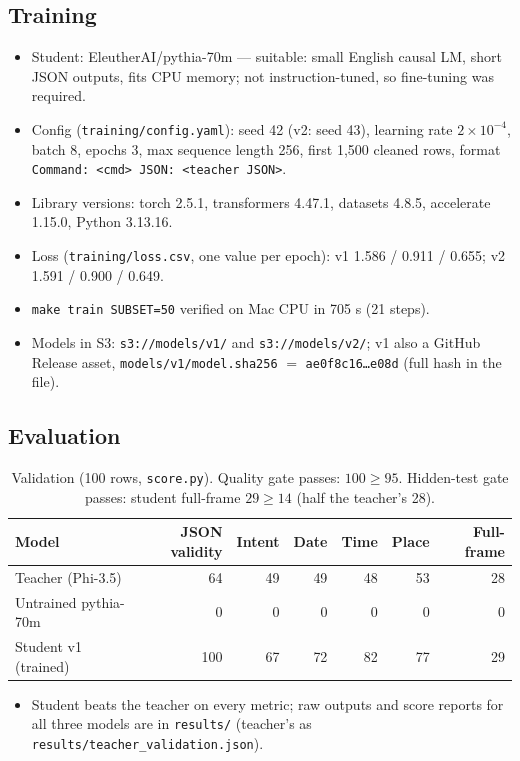 \documentclass[11pt,a4paper]{article}
\begin{document}
\subsection*{Training}
\begin{itemize}
\item Student: EleutherAI/pythia-70m --- suitable: small English causal LM, short JSON outputs, fits CPU memory; not instruction-tuned, so fine-tuning was required.
\item Config (\texttt{training/config.yaml}): seed 42 (v2: seed 43), learning rate $2\times10^{-4}$, batch 8, epochs 3, max sequence length 256, first 1,500 cleaned rows, format \texttt{Command: <cmd> JSON: <teacher JSON>}.
\item Library versions: torch 2.5.1, transformers 4.47.1, datasets 4.8.5, accelerate 1.15.0, Python 3.13.16.
\item Loss (\texttt{training/loss.csv}, one value per epoch): v1 1.586 / 0.911 / 0.655; v2 1.591 / 0.900 / 0.649.
\item \texttt{make train SUBSET=50} verified on Mac CPU in 705 s (21 steps).
\item Models in S3: \texttt{s3://models/v1/} and \texttt{s3://models/v2/}; v1 also a GitHub Release asset, \texttt{models/v1/model.sha256} $=$ \texttt{ae0f8c16\ldots e08d} (full hash in the file).
\end{itemize}
\subsection*{Evaluation}
\begin{table}[h]\centering\small
\begin{tabular}{lrrrrrr}
\toprule
Model & JSON validity & Intent & Date & Time & Place & Full-frame \\
\midrule
Teacher (Phi-3.5) & 64 & 49 & 49 & 48 & 53 & 28 \\
Untrained pythia-70m & 0 & 0 & 0 & 0 & 0 & 0 \\
Student v1 (trained) & 100 & 67 & 72 & 82 & 77 & 29 \\
\bottomrule
\end{tabular}
\caption{Validation (100 rows, \texttt{score.py}). Quality gate passes: $100 \ge 95$. Hidden-test gate passes: student full-frame $29 \ge 14$ (half the teacher's 28).}
\end{table}
\begin{itemize}
\item Student beats the teacher on every metric; raw outputs and score reports for all three models are in \texttt{results/} (teacher's as \texttt{results/teacher\_validation.json}).
\end{itemize}
\end{document}

